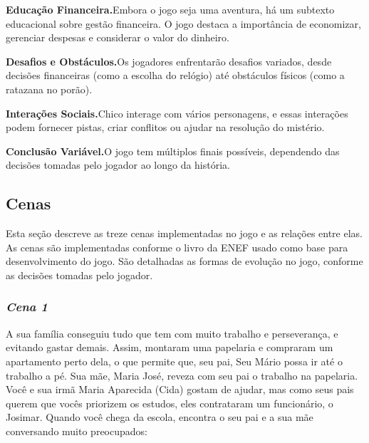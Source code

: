 \medskip\noindent \textbf{Educação Financeira.}\quad Embora o jogo seja uma aventura, há um subtexto educacional sobre gestão financeira. O jogo destaca a importância de economizar, gerenciar despesas e considerar o valor do dinheiro.

\medskip\noindent \textbf{Desafios e Obstáculos.}\quad Os jogadores enfrentarão desafios variados, desde decisões financeiras (como a escolha do relógio) até obstáculos físicos (como a ratazana no porão).

\medskip\noindent \textbf{Interações Sociais.}\quad Chico interage com vários personagens, e essas interações podem fornecer pistas, criar conflitos ou ajudar na resolução do mistério.

\medskip\noindent \textbf{Conclusão Variável.}\quad O jogo tem múltiplos finais possíveis, dependendo das decisões tomadas pelo jogador ao longo da história.


\subsection{Cenas}

Esta seção descreve as treze cenas implementadas no jogo e as relações entre elas. As cenas são implementadas conforme o livro da ENEF usado como base para desenvolvimento do jogo. São detalhadas as formas de evolução no jogo, conforme as decisões tomadas pelo jogador.


\subsubsection*{\textit{\textbf{Cena 1}}}

A sua família conseguiu tudo que tem com muito trabalho e perseverança, e evitando gastar demais. Assim, montaram uma papelaria e compraram um apartamento perto dela, o que permite que, seu pai, Seu Mário possa ir até o trabalho a pé. Sua mãe, Maria José, reveza com seu pai o trabalho na papelaria. Você e sua irmã Maria Aparecida (Cida) gostam de ajudar, mas como seus pais querem que vocês priorizem os estudos, eles contrataram um funcionário, o Josimar. Quando você chega da escola, encontra o seu pai e a sua mãe conversando muito preocupados:

